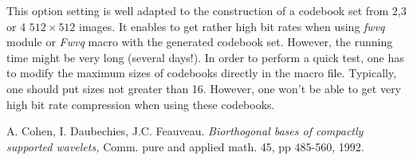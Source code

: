 This option setting is well adapted to the construction of a codebook set 
from 2,3 or 4 $512\times 512$ images. It enables to get rather high bit rates 
when using {\em fwvq} module or {\em Fwvq} macro with the generated codebook 
set. However, the running time might be very long (several days!). 
In order to perform a quick test, one has to modify the maximum sizes 
of codebooks directly in the macro file. Typically, one should put 
sizes not greater than 16. However, one won't be able to get 
very high bit rate compression when using these codebooks.

\begin{thebibliography}{CDF}

 A. Cohen, I. Daubechies, J.C. Feauveau. 
{\em Biorthogonal bases of compactly supported wavelets, } 
Comm. pure and applied math. 45, pp 485-560, 1992.

\end{thebibliography}
